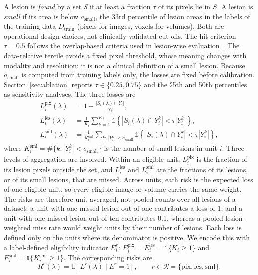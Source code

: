 \documentclass[sn-mathphys-num]{sn-jnl}%
\theoremstyle{thmstyleone}
\theoremstyle{thmstyletwo}
\theoremstyle{thmstylethree}
\newcommand{\E}{\mathbb{E}}
\newcommand{\1}{\mathbb{1}}
\newcommand{\pix}{\mathrm{pix}}
\newcommand{\les}{\mathrm{les}}
\newcommand{\sml}{\mathrm{sml}}
\begin{document}
A lesion is \emph{found} by a set $S$ if at least a fraction $\tau$ of its pixels lie in $S$. A lesion is \emph{small} if its area is below $a_{\mathrm{small}}$, the 33rd percentile of lesion areas in the labels of the training data $D_{\mathrm{train}}$ (pixels for images, voxels for volumes). Both are operational design choices, not clinically validated cut-offs. The hit criterion $\tau=0.5$ follows the overlap-based criteria used in lesion-wise evaluation~\cite{maierhein2024metrics,moawad2023bratsmets}. The data-relative tercile avoids a fixed pixel threshold, whose meaning changes with modality and resolution; it is not a clinical definition of a small lesion. Because $a_{\mathrm{small}}$ is computed from training labels only, the losses are fixed before calibration. Section~\ref{sec:ablation} reports $\tau\in\{0.25,0.75\}$ and the 25th and 50th percentiles as sensitivity analyses. The three losses are
\begin{align}
L_i^{\pix}(\lambda)&=1-\frac{|S_i(\lambda)\cap Y_i|}{|Y_i|}, \label{eq:lpix}\\
L_i^{\les}(\lambda)&=\frac{1}{K_i}\sum_{k=1}^{K_i}\1\!\left\{|S_i(\lambda)\cap Y_i^k|<\tau|Y_i^k|\right\}, \label{eq:lles}\\
L_i^{\sml}(\lambda)&=\frac{1}{K^{\sml}_i}\sum_{k:\,|Y_i^k|<a_{\mathrm{small}}}\1\!\left\{|S_i(\lambda)\cap Y_i^k|<\tau|Y_i^k|\right\}, \label{eq:lsml}
\end{align}
where $K^{\sml}_i=\#\{k:|Y_i^k|<a_{\mathrm{small}}\}$ is the number of small lesions in unit $i$. Three levels of aggregation are involved. Within an eligible unit, $L_i^{\pix}$ is the fraction of its lesion pixels outside the set, and $L_i^{\les}$ and $L_i^{\sml}$ are the fractions of its lesions, or of its small lesions, that are missed. Across units, each risk is the expected loss of one eligible unit, so every eligible image or volume carries the same weight. The risks are therefore unit-averaged, not pooled counts over all lesions of a dataset: a unit with one missed lesion out of one contributes a loss of 1, and a unit with one missed lesion out of ten contributes 0.1, whereas a pooled lesion-weighted miss rate would weight units by their number of lesions. Each loss is defined only on the units where its denominator is positive. We encode this with a label-defined eligibility indicator $E_i^r$: $E_i^{\pix}=E_i^{\les}=\1\{K_i\ge1\}$ and $E_i^{\sml}=\1\{K^{\sml}_i\ge1\}$. The corresponding risks are
\begin{equation}\label{eq:risks}
R^r(\lambda)=\E\!\left[L^r(\lambda)\mid E^r=1\right],\qquad r\in\mathcal R=\{\pix,\les,\sml\}.
\end{equation}
\end{document}
